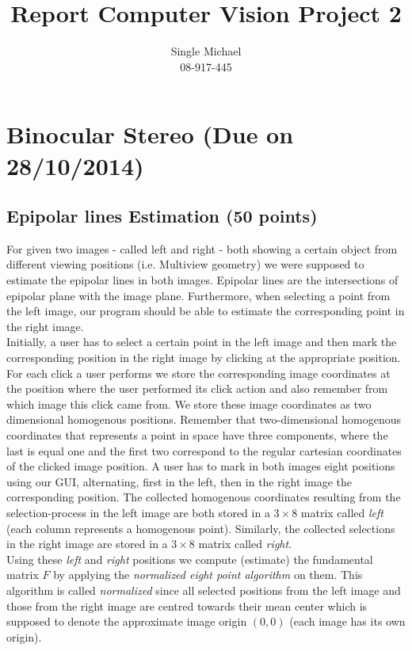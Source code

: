 \documentclass{paper}
\title{Report Computer Vision Project 2}
\author{Single Michael\\08-917-445}
\begin{document}
\maketitle


\section{Binocular Stereo (Due on 28/10/2014)}



\subsection{Epipolar lines Estimation (50 points)}
For given two images - called left and right - both showing a certain object from different viewing positions (i.e. Multiview geometry) we were supposed to estimate the epipolar lines in both images. Epipolar lines are the intersections of epipolar plane with the image plane. Furthermore, when selecting a point from the left image, our program should be able to estimate the corresponding point in the right image. \\

Initially, a user has to select a certain point in the left image and then mark the corresponding position in the right image by clicking at the appropriate position. For each click a user performs we store the corresponding image coordinates at the position where the user performed its click action and also remember from which image this click came from. We store these image coordinates as two dimensional homogenous positions. Remember that two-dimensional homogenous coordinates that represents a point in space have three components, where the last is equal one and the first two correspond to the regular cartesian coordinates of the clicked image position. A user has to mark in both images eight positions using our GUI, alternating, first in the left, then in the right image the corresponding position. The collected homogenous coordinates resulting from the selection-process in the left image are both stored in a $3 \times 8$ matrix called \emph{left} (each column represents a homogenous point). Similarly, the collected selections in the right image are stored in a $3 \times 8$ matrix called \emph{right}. \\

Using these \emph{left} and \emph{right} positions we compute (estimate) the fundamental matrix $F$ by applying the \emph{normalized eight point algorithm} on them. This algorithm is called \emph{normalized} since all selected positions from the left image and those from the right image are centred towards their mean center which is supposed to denote the approximate image origin $(0,0)$ (each image has its own origin). \\ 
\end{document}
